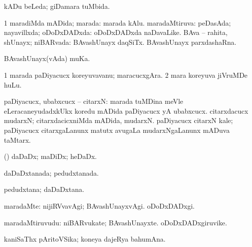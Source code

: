 {{{{{{{\bentry
{} 
\gl{\gu}
\expl{}
\bmng
kADu beLeda; giDamara tuMbida. 
\emng
\eentry

\bentry
{} 
\gl{\gu}
\expl{}
\bmng
\bnum
\num{1} maradiMda mADida; marada:  marada kAlu. 
 maradaMtiruva: 
\banum
{} peDasAda; nayavillxda; oDoDxDADxda:  oDoDxDADxda naDavaLike. 
 BAva -- rahita, shUnayx; niBARvada:  BAvashUnayx daqSiTx.  BAvashUnayx parxdashaRna. 
\eanum
\numie
\enum
\emng
\eentry

\bentry
{}
\gl{\nA}
\expl{}
\bmng
BAvashUnayx(vAda) muKa. 
\emng
\eentry

\bentry
{} 
\gl{\nA}
\expl{}
\bmng
\bnum
\num{1} marada paDiyacucx koreyuvavanu; maracucxgAra. 
\num{2} mara koreyuva jiVruMDe huLu. 
\enum
\emng
\eentry

\bentry
{} 
\gl{\nA}
\expl{}
\bmng
paDiyacucx, ubabxcucx -- citarxN: 
\banum
{} marada tuMDina meVle eLeracaneyudadxkUkx koredu mADida paDiyacucx yA ubabxcucx. 
 citarxdacucx mudarxN; citarxdacicxniMda mADida, mudarxN. 
 paDiyacucx citarxN kale; paDiyacucx citarxgaLanunx matutx avugaLa mudarxNgaLanunx mADuva taMtarx. 
\eanum
\emng
\eentry

 \bentry
{} 
\gl{\nA}
\expl{}
\bmng
(\AmA) daDaDx; maDiDx; heDaDx. 
\emng
\eentry

\bentry
{} 
\gl{\gu}
\expl{}
\bmng
daDaDxtanada; pedudxtanada. 
\emng
\eentry

\bentry
{} 
\gl{\nA}
\expl{}
\bmng
pedudxtana; daDaDxtana. 
\emng
\eentry

\bentry
{} 
\gl{\nA}
\expl{}
\bmng
{} 
\emng
\eentry

\bentry 
{} 
\gl{\kirxvi}
\expl{}
\bmng
maradaMte: 
\banum
{} nijiRVvavAgi; BAvashUnayxvAgi. 
 oDoDxDADxgi. 
\eanum
\emng
\eentry

\bentry
{} 
\gl{\nA}
\bmng
maradaMtiruvudu: 
\banum
{} niBARvukate; BAvashUnayxte. 
 oDoDxDADxgiruvike. 
\eanum
\emng
\eentry

\bentry
{} 
\gl{\nA}
\expl{}
\bmng
kaniSaThx pAritoVSika; koneya dajeRya bahumAna. 
\emng
\eentry

}}}}}}}
